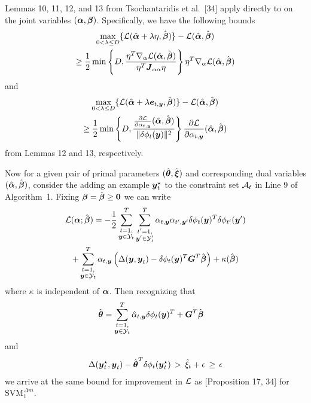 \documentclass[10pt,journal,letterpaper,compsoc]{IEEEtran}
\numberwithin{equation}{section}
\begin{document}
Lemmas 10, 11, 12, and 13 from Tsochantaridis et al.~[34] apply
directly to  on the joint variables $(\boldsymbol{\alpha},
\boldsymbol{\beta})$. Specifically, we have the following bounds
%
\begin{multline}
  \max_{0 < \lambda \leq D} \{\Ell(\hat{\balpha} + \lambda \eta, \hat{\bbeta})\} 
  - \Ell(\hat{\balpha}, \hat{\bbeta}) 
  \\
  \geq \frac{1}{2} \min \left\{D, 
  \frac{\eta^T \nabla_{\alpha} \Ell(\hat{\balpha}, \hat{\bbeta})}{\eta^T \bJ_{\alpha\alpha} \eta}
  \right\} \eta^T \nabla_{\alpha} \Ell(\hat{\balpha}, \hat{\bbeta})
\end{multline}
%
and
%
\begin{multline}
  \max_{0 < \lambda \leq D} \{\Ell(\hat{\balpha} + \lambda \be_{t,\by}, \hat{\bbeta})\} 
  - \Ell(\hat{\balpha}, \hat{\bbeta}) 
  \\
  \geq \frac{1}{2} \min \left\{D, 
  \frac{\frac{\partial \Ell}{\partial \alpha_{t,\by}}(\hat{\balpha}, \hat{\bbeta})}{\|\delta \phi_t(\by)\|^2} 
  \right\}
  \frac{\partial \Ell}{\partial \alpha_{t,\by}}(\hat{\balpha}, \hat{\bbeta})
\end{multline}
%
from Lemmas 12 and 13, respectively.


Now for a given pair of primal parameters $(\hat{\boldsymbol{\theta}},
\hat{\boldsymbol{\xi}})$ and corresponding dual variables $(\hat{\boldsymbol{\alpha}},
\hat{\boldsymbol{\beta}})$, consider the adding an example ${\boldsymbol{y}}_t^\star$ to the
constraint set $\A_t$ in Line 9 of Algorithm~1. Fixing $\boldsymbol{\beta} =
\hat{\boldsymbol{\beta}} \geq \textbf{0}$ we can write
%
\begin{multline}
  \Ell(\balpha; \hat{\bbeta}) =
  -\frac{1}{2} \sum_{\substack{t=1,\\\by \in \Y_t}}^{T} \sum_{\substack{t'=1,\\\by' \in \Y_t'}}^{T}
  \alpha_{t, \by} \alpha_{t', \by'} \delta\phi_t(\by)^T \delta\phi_{t'}(\by') \\
  + \sum_{\substack{t=1,\\\by \in \Y_t}}^{T} \alpha_{t, \by} \left(\Delta(\by, \by_t) - \delta\phi_t(\by)^T \bG^T \hat{\bbeta} \right) + \kappa(\hat{\bbeta})
\end{multline}
%
where $\kappa$ is independent of $\boldsymbol{\alpha}$. Then recognizing that
%
\begin{align}
  \hat{\btheta} &= \sum_{\substack{t=1,\\\by \in \Y_t}}^{T} \hat{\alpha}_{t, \by} \delta\phi_t(\by)^T + \bG^T \hat{\bbeta}
\end{align}
%
and
%
\begin{align}
  \Delta({\boldsymbol{y}}^\star_t, {\boldsymbol{y}}_t) - \hat{\boldsymbol{\theta}}^T\delta\phi_t({\boldsymbol{y}}_t^\star)
  \,>\, \hat{\xi}_t + \epsilon \,\geq\, \epsilon
\end{align}
% 
we arrive at the same bound for improvement in $\Ell$ as
[Proposition 17, 34] for $\text{SVM}_1^{\Delta
  m}$.
\end{document}

